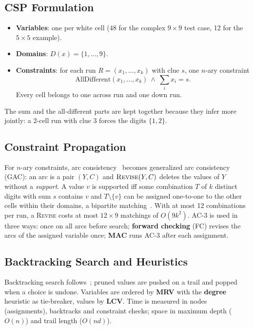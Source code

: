 \documentclass[conference]{IEEEtran}
\begin{document}
\subsection{CSP Formulation}
\begin{itemize}
    \item \textbf{Variables}: one per white cell (48 for the complex $9\times 9$ test case, 12 for the $5\times 5$ example).
    \item \textbf{Domains}: $D(x)=\{1,\dots,9\}$.
    \item \textbf{Constraints}: for each run $R=(x_1,\dots,x_k)$ with clue $s$, one $n$-ary constraint
    \begin{equation}
        \text{AllDifferent}(x_1,\dots,x_k)\ \wedge\ \textstyle\sum_{i} x_i=s .
    \end{equation}
    Every cell belongs to one across run and one down run.
\end{itemize}
The sum and the all-different parts are kept together because they infer more jointly: a 2-cell run with clue 3 forces the digits $\{1,2\}$.

\subsection{Constraint Propagation}
For $n$-ary constraints, arc consistency~\cite{mackworth} becomes generalized arc consistency (GAC): an arc is a pair $(Y,C)$ and $\textsc{Revise}(Y,C)$ deletes the values of $Y$ without a \emph{support}. A value $v$ is supported iff some combination $T$ of $k$ distinct digits with sum $s$ contains $v$ and $T\setminus\{v\}$ can be assigned one-to-one to the other cells within their domains, a bipartite matching~\cite{regin}. With at most 12 combinations per run, a \textsc{Revise} costs at most $12\times 9$ matchings of $O(9k^2)$. AC-3 is used in three ways: once on all arcs before search; \textbf{forward checking} (FC) revises the arcs of the assigned variable once; \textbf{MAC} runs AC-3 after each assignment.

\subsection{Backtracking Search and Heuristics}
Backtracking search follows~\cite{aima}; pruned values are pushed on a trail and popped when a choice is undone. Variables are ordered by \textbf{MRV} with the \textbf{degree} heuristic as tie-breaker, values by \textbf{LCV}. Time is measured in nodes (assignments), backtracks and constraint checks; space in maximum depth ($O(n)$) and trail length ($O(nd)$).
\end{document}
